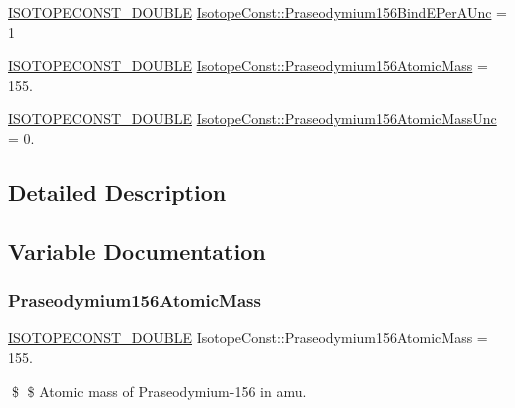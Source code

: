\begin{DoxyCompactItemize}
\item 
\mbox{\hyperlink{group___isotope_const-_macros_ga8f45a7272ce02c0b4c65c44636ed719a}{I\+S\+O\+T\+O\+P\+E\+C\+O\+N\+S\+T\+\_\+\+D\+O\+U\+B\+LE}} \mbox{\hyperlink{group___isotope_const-_praseodymium-_pr156_gaf08519a1776ca330346b095e8f74e04a}{Isotope\+Const\+::\+Praseodymium156\+Bind\+E\+Per\+A\+Unc}} = 1
\item 
\mbox{\hyperlink{group___isotope_const-_macros_ga8f45a7272ce02c0b4c65c44636ed719a}{I\+S\+O\+T\+O\+P\+E\+C\+O\+N\+S\+T\+\_\+\+D\+O\+U\+B\+LE}} \mbox{\hyperlink{group___isotope_const-_praseodymium-_pr156_ga8fde3295b8fbd4eafcc2f8913386f02c}{Isotope\+Const\+::\+Praseodymium156\+Atomic\+Mass}} = 155.
\item 
\mbox{\hyperlink{group___isotope_const-_macros_ga8f45a7272ce02c0b4c65c44636ed719a}{I\+S\+O\+T\+O\+P\+E\+C\+O\+N\+S\+T\+\_\+\+D\+O\+U\+B\+LE}} \mbox{\hyperlink{group___isotope_const-_praseodymium-_pr156_gaf84cc9a07fa2bb78a05de681a0142850}{Isotope\+Const\+::\+Praseodymium156\+Atomic\+Mass\+Unc}} = 0.
\end{DoxyCompactItemize}


\subsection{Detailed Description}


\subsection{Variable Documentation}
\mbox{\label{group___isotope_const-_praseodymium-_pr156_ga8fde3295b8fbd4eafcc2f8913386f02c}} 
\subsubsection{\texorpdfstring{Praseodymium156\+Atomic\+Mass}{Praseodymium156AtomicMass}}
{\footnotesize\ttfamily \mbox{\hyperlink{group___isotope_const-_macros_ga8f45a7272ce02c0b4c65c44636ed719a}{I\+S\+O\+T\+O\+P\+E\+C\+O\+N\+S\+T\+\_\+\+D\+O\+U\+B\+LE}} Isotope\+Const\+::\+Praseodymium156\+Atomic\+Mass = 155.}

\$ \$ Atomic mass of Praseodymium-\/156 in amu. \mbox{\label{group___isotope_const-_praseodymium-_pr156_gaf84cc9a07fa2bb78a05de681a0142850}} 
